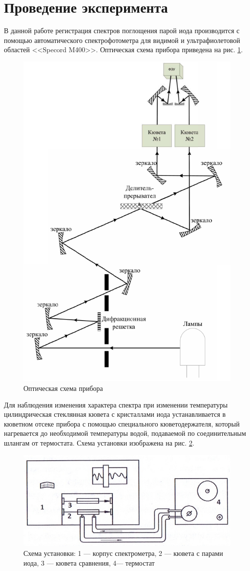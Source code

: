 \section{Проведение эксперимента}
В данной работе регистрация спектров поглощения парой иода производится с помощью автоматического спектрофотометра для видимой и ультрафиолетовой областей <<Specord M400>>. Оптическая схема прибора приведена на рис. \ref{fig:ust}.

\begin{figure}[h!]
\centering
\includegraphics[width=0.6\linewidth]{ust.png}
\caption{Оптическая схема прибора}
\label{fig:ust}
\end{figure}

Для наблюдения изменения характера спектра при изменении температуры цилиндрическая стеклянная кювета с кристаллами иода устанавливается в кюветном отсеке прибора с помощью специального кюветодержателя, который нагревается до необходимой температуры водой, подаваемой по соединительным шлангам от термостата. Схема установки изображена на рис. \ref{fig:ust1}.

\begin{figure}[h!]
	\centering
	\includegraphics[width=0.4\linewidth]{ust1.jpg}
	\caption{Схема установки: 1 --- корпус спектрометра, 2 --- кювета с парами иода, 3 --- кювета сравнения, 4--- термостат}
	\label{fig:ust1}
\end{figure}

